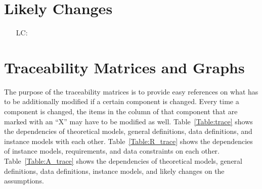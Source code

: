 \documentclass[12pt]{article}
\newcounter{lcnum} %
\begin{document}
\section{Likely Changes}    

\noindent \begin{itemize}

\item[LC\refstepcounter{lcnum}\thelcnum\label{LC_meaningfulLabel}:] 

\end{itemize}

\section{Traceability Matrices and Graphs}

The purpose of the traceability matrices is to provide easy references on what
has to be additionally modified if a certain component is changed.  Every time a
component is changed, the items in the column of that component that are marked
with an ``X'' may have to be modified as well.  Table~\ref{Table:trace} shows the
dependencies of theoretical models, general definitions, data definitions, and
instance models with each other. Table~\ref{Table:R_trace} shows the
dependencies of instance models, requirements, and data constraints on each
other. Table~\ref{Table:A_trace} shows the dependencies of theoretical models,
general definitions, data definitions, instance models, and likely changes on
the assumptions.



\end{document}
